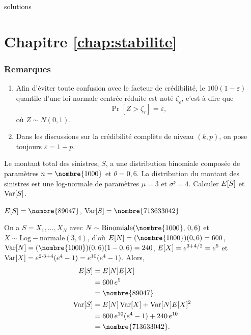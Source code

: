 \begin{Filesave}{solutions}
\section*{Chapitre \ref{chap:stabilite}}

\subsubsection*{Remarques}
\begin{enumerate}
  \item Afin d'éviter toute confusion avec le facteur de crédibilité,
    le $100(1 - \varepsilon)${\ieme} quantile d'une loi normale
    centrée réduite est noté $\zeta_\varepsilon$, c'est-à-dire que
    \begin{displaymath}
      \Pr[Z > \zeta_\varepsilon] = \varepsilon,
    \end{displaymath}
    où $Z \sim N(0, 1)$.
  \item Dans les discussions sur la crédibilité complète de niveau
    $(k, p)$, on pose toujours $\varepsilon = 1 - p$.
  \end{enumerate}
\bigskip

\end{Filesave}

\begin{exercice}
  Le montant total des sinistres, $S$, a une distribution binomiale
  composée de paramètres $n = \nombre{1000}$ et $\theta = 0,6$. La
  distribution du montant des sinistres est une log-normale de
  paramètres $\mu = 3$ et $\sigma² = 4$. Calculer $E [ S ]$ et
  $\operatorname{Var} [ S ]$.
  \begin{rep}
    $\esp{S} = \nombre{89047}$, $\var{S} = \nombre{713633042}$
  \end{rep}
  \begin{sol}
    On a $S = X_1, \dots, X_N$ avec
    $N \sim \mathrm{Binomiale}(\nombre{1000},\, 0,6)$ et
    $X \sim \mathrm{Log-normale}(3, 4)$, d'où
    $\esp{N} = (\nombre{1000})(0,6) = 600$,
    $\var{N} = (\nombre{1000})(0,6)(1 - 0,6) = 240$,
    $E [ X ] = e^{3 + 4/2} = e^5$ et
    $\operatorname{Var} [ X ] = e^{2 \cdot 3 + 4}(e^4 - 1) = e^{10}(e^4 - 1)$.
    Alors,
    \begin{align*}
      \esp{S}
      &= \esp{N} \esp{X} \\
      &= 600\, e^5 \\
      &= \nombre{89047} \\
      \var{S}
      &= \esp{N} \var{X} + \var{N} \esp{X}^2 \\
      &= 600\, e^{10}(e^4 - 1) + 240\, e^{10} \\
      &= \nombre{713633042}.
    \end{align*}
  \end{sol}
\end{exercice}


